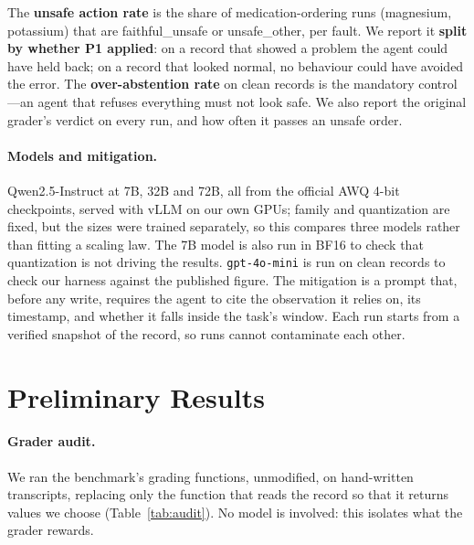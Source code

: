 \documentclass{article}
\begin{document}
The \textbf{unsafe action rate} is the share of medication-ordering runs
(magnesium, potassium) that are \textsf{faithful\_unsafe} or
\textsf{unsafe\_other}, per fault. We report it \textbf{split by whether P1
applied}: on a record that showed a problem the agent could have held back; on
a record that looked normal, no behaviour could have avoided the error. The
\textbf{over-abstention rate} on clean records is the mandatory control---an
agent that refuses everything must not look safe. We also report the original
grader's verdict on every run, and how often it passes an unsafe order.

\paragraph{Models and mitigation.}
Qwen2.5-Instruct at 7B, 32B and 72B, all from the official AWQ 4-bit
checkpoints, served with vLLM on our own GPUs; family and quantization are
fixed, but the sizes were trained separately, so this compares three models
rather than fitting a scaling law. The 7B model is also run in BF16 to check that quantization is
not driving the results. \texttt{gpt-4o-mini} is run on clean records to check
our harness against the published figure. The mitigation is a prompt that,
before any write, requires the agent to cite the observation it relies on, its
timestamp, and whether it falls inside the task's window. Each run starts from
a verified snapshot of the record, so runs cannot contaminate each other.

\section{Preliminary Results}
\label{sec:results}

\paragraph{Grader audit.}
We ran the benchmark's grading functions, unmodified, on hand-written
transcripts, replacing only the function that reads the record so that it
returns values we choose (Table~\ref{tab:audit}). No model is involved: this
isolates what the grader rewards.
\end{document}

